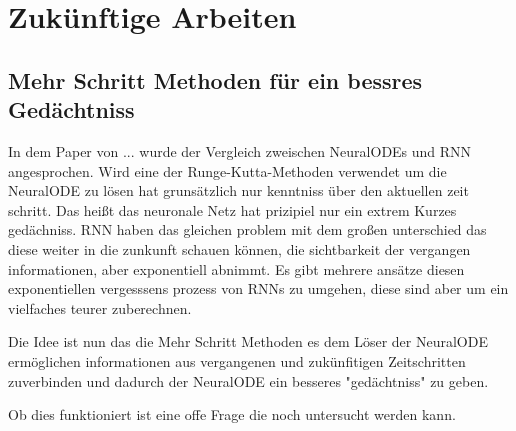 
\section{Zukünftige Arbeiten}

\subsection{Mehr Schritt Methoden für ein bessres Gedächtniss}

In dem Paper von ... wurde der Vergleich zweischen NeuralODEs und RNN angesprochen.
Wird eine der Runge-Kutta-Methoden verwendet um die NeuralODE zu lösen hat grunsätzlich nur kenntniss
über den aktuellen zeit schritt.
Das heißt das neuronale Netz hat prizipiel nur ein extrem Kurzes gedächniss.
RNN haben das gleichen problem mit dem großen unterschied das diese weiter in die zunkunft schauen können, 
die sichtbarkeit der vergangen informationen, aber exponentiell abnimmt.
Es gibt mehrere ansätze diesen exponentiellen vergesssens prozess von RNNs zu umgehen, 
diese sind aber um ein vielfaches teurer zuberechnen.

Die Idee ist nun das die Mehr Schritt Methoden es dem Löser der NeuralODE ermöglichen informationen 
aus vergangenen und zukünfitigen Zeitschritten zuverbinden und dadurch der NeuralODE ein besseres 
"gedächtniss" zu geben.

Ob dies funktioniert ist eine offe Frage die noch untersucht werden kann.



